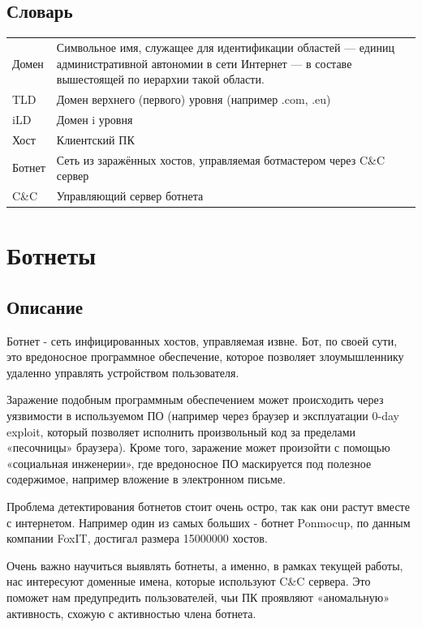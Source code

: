 \documentclass[14pt]{extreport}
\begin{document}
	\section{Словарь}
	\begin{tabular}{p{3cm} p{10cm}}
	\hline
			Домен & Символьное имя, служащее для идентификации областей — единиц административной автономии в сети Интернет — в составе вышестоящей по иерархии такой области. \\ 
			TLD & Домен верхнего (первого) уровня (например .com, .eu) \\
			iLD & Домен i уровня \\
			Хост & Клиентский ПК \\
			Ботнет & Сеть из заражённых хостов, управляемая ботмастером через C\&C сервер \\
			C\&C & Управляющий сервер ботнета \\
			 \hline

	\end{tabular}
	
	\chapter{Ботнеты}
	\section{Описание}
	Ботнет - сеть инфицированных хостов, управляемая извне. Бот, по своей сути, это вредоносное программное обеспечение, которое позволяет злоумышленнику удаленно управлять устройством пользователя.
	
	Заражение подобным программным обеспечением может происходить через
уязвимости в используемом ПО (например через браузер и эксплуатации 0-day
exploit, который позволяет исполнить произвольный код за пределами
«песочницы» браузера). Кроме того, заражение может произойти с помощью
«социальная инженерии», где вредоносное ПО маскируется под полезное
содержимое, например вложение в электронном письме.

	Проблема детектирования ботнетов стоит очень остро, так как они растут вместе с интернетом. Например один из самых больших - ботнет Ponmocup, по данным компании FoxIT, достигал размера 15000000 хостов.
	
	Очень важно научиться выявлять ботнеты, а именно, в рамках текущей
работы, нас интересуют доменные имена, которые используют C\&C сервера.
Это поможет нам предупредить пользователей, чьи ПК проявляют
«аномальную» активность, схожую с активностью члена ботнета.
	
\end{document}
